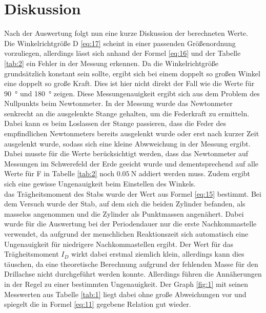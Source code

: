 
\section{Diskussion}\justifying
Nach der Auswertung folgt nun eine kurze Diskussion der berechneten Werte.\\
Die Winkelrichtgröße D \eqref{eq:17} scheint in einer passenden
Größenordnung vorzuliegen, allerdings lässt sich anhand der Formel \eqref{eq:16}
und der Tabelle \ref{tab:2} ein Fehler in der Messung erkennen.
Da die Winkelrichtgröße grundsätzlich konstant sein sollte, ergibt sich bei einem
doppelt so großen Winkel eine doppelt so große Kraft. Dies ist hier nicht direkt der Fall
wie die Werte für \SI{90}{\degree} und \SI{180}{\degree} zeigen. Diese Messungenauigkeit
ergibt sich aus dem Problem des Nullpunkts beim Newtonmeter. In der Messung wurde das
Newtonmeter senkrecht an die ausgelenkte Stange gehalten, um die Federkraft zu ermitteln. Dabei kann es
beim Loslassen der Stange passieren, dass die Feder des empfindlichen Newtonmeters bereits ausgelenkt wurde oder 
erst nach kurzer Zeit ausgelenkt wurde, sodass sich eine kleine Abwweichung in der Messung ergibt.
Dabei musste für die Werte berücksichtigt werden, dass das Newtonmeter auf Messungen im 
Schwerefeld der Erde geeicht wurde und dementsprechend auf alle Werte für F in Tabelle 
\ref{tab:2} noch $\SI{0.05}{\newton} $ addiert werden muss.
Zudem ergibt sich eine gewisse Ungenauigkeit beim Einstellen des Winkels. \\

\justifying \;das Trägheitsmoment des Stabs wurde der Wert aus Formel \eqref{eq:15} bestimmt.
Bei dem Versuch wurde der Stab, auf dem sich die beiden Zylinder befanden, als masselos angenommen  und
die Zylinder als Punktmassen angenähert. Dabei wurde für die Auswertung bei der Periodendauer
nur die erste Nachkommastelle verwendet, da aufgrund der menschlichen Reaktionszeit sich
automatisch eine Ungenauigkeit für niedrigere Nachkommastellen ergibt.
Der Wert für das Trägheitsmoment $I_D$ wirkt dabei erstmal ziemlich klein, allerdings kann
dies täuschen, da eine theoretische Berechnung aufgrund der fehlenden Masse für den 
Drillachse nicht durchgeführt werden konnte. Allerdings führen die Annäherungen in der 
Regel zu einer bestimmten Ungenauigkeit.
Der Graph \ref{fig:1} mit seinen Messwerten aus Tabelle \ref{tab:1} liegt dabei ohne große 
Abweichungen vor und spiegelt die in Formel \eqref{eq:11} gegebene Relation gut wieder.\\

